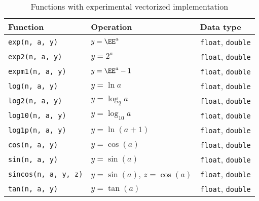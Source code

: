\begin{table}
  \begin{tabularx}{\textwidth}{LLL}
    \toprule
    Function & Operation & Data type \\
    \midrule
    \texttt{exp(n, a, y)}       & $y = \EE^a$
    & \texttt{float}, \texttt{double} \\
    \texttt{exp2(n, a, y)}      & $y = 2^a$
    & \texttt{float}, \texttt{double} \\
    \texttt{expm1(n, a, y)}     & $y = \EE^a - 1$
    & \texttt{float}, \texttt{double} \\
    \texttt{log(n, a, y)}       & $y = \ln a$
    & \texttt{float}, \texttt{double} \\
    \texttt{log2(n, a, y)}      & $y = \log_2 a$
    & \texttt{float}, \texttt{double} \\
    \texttt{log10(n, a, y)}     & $y = \log_{10} a$
    & \texttt{float}, \texttt{double} \\
    \texttt{log1p(n, a, y)}     & $y = \ln(a + 1)$
    & \texttt{float}, \texttt{double} \\
    \texttt{cos(n, a, y)}       & $y = \cos(a)$
    & \texttt{float}, \texttt{double} \\
    \texttt{sin(n, a, y)}       & $y = \sin(a)$
    & \texttt{float}, \texttt{double} \\
    \texttt{sincos(n, a, y, z)} & $y = \sin(a)$, $z = \cos(a)$
    & \texttt{float}, \texttt{double} \\
    \texttt{tan(n, a, y)}       & $y = \tan(a)$
    & \texttt{float}, \texttt{double} \\
    \bottomrule
  \end{tabularx}
  \caption{Functions with experimental vectorized implementation}
  \label{tab:Functions with experimental vectorized implementation}
\end{table}

